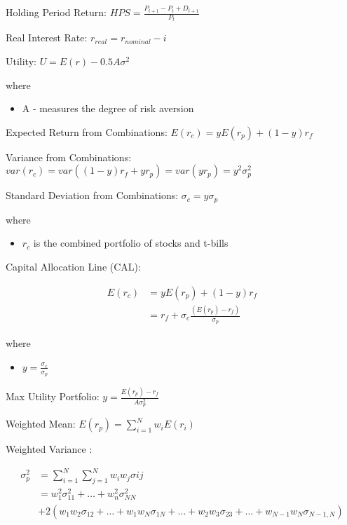 \documentclass{article}
\begin{document}
Holding Period Return: $ HPS = \frac{P_{t+1} - P_{t} + D_{t+1}}{P_{t}} $

Real Interest Rate: $ r_{real} = r_{nominal} - i $

Utility: $ U = E(r) - 0.5A\sigma^{2} $

where
\begin{itemize}

    \item A - measures the degree of risk aversion

\end{itemize}

Expected Return from Combinations: $ E(r_c) = yE(r_p) + (1 - y)r_f $

Variance from Combinations: $ var(r_c) = var((1-y)r_f + yr_p) = var(yr_p) = y^2\sigma^2_p $

Standard Deviation from Combinations: $ \sigma_c = y\sigma_p $

where
\begin{itemize}

    \item $r_c$ is the combined portfolio of stocks and t-bills

\end{itemize}

Capital Allocation Line (CAL):

\begin{align*}
    E(r_c) 
    &= yE(r_p) + (1 - y)r_f \\
    &= r_f + \sigma_c\frac{(E(r_p) - r_f)}{\sigma_p} 
\end{align*}

where
\begin{itemize}

    \item $ y = \frac{\sigma_c}{\sigma_p} $

\end{itemize}

Max Utility Portfolio: $ y = \frac{E(r_p) - r_f}{A\sigma^2_p} $

Weighted Mean: $ E(r_p) = \sum^{N}_{i=1} w_iE(r_i) $

Weighted Variance :

\begin{align*}
    \sigma^2_p 
    &= \sum^{N}_{i=1} \sum^{N}_{j=1} w_i w_j \sigma{ij} \\
    &= w^2_1\sigma^2_{11} + \ldots + w^2_n \sigma^2_{NN} \\
    &+ 2(w_1w_2\sigma_{12} + \ldots + w_1 w_N \sigma_{1N} + \ldots + w_2 w_3 \sigma_{23} + \ldots + w_{N-1} w_N \sigma_{N-1, N})
\end{align*}
\end{document}
